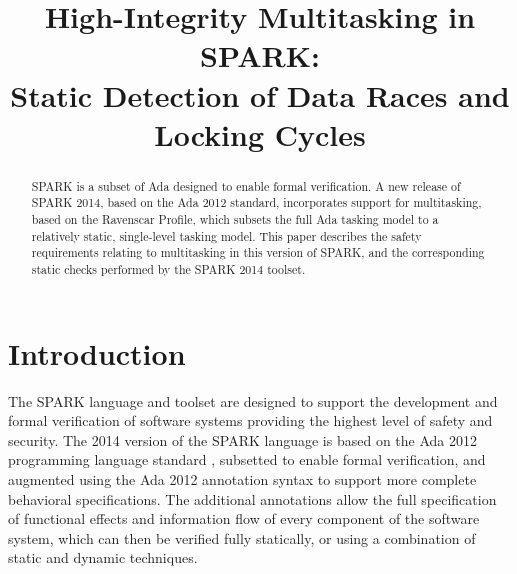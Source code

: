 \documentclass[conference,compsoc]{IEEEtran}
\begin{document}
\title{High-Integrity Multitasking in SPARK:\\
  Static Detection of Data Races and Locking Cycles}

\author{
\and
{}
\and
{}
}

\maketitle

%
%

\begin{abstract}
  SPARK is a subset of Ada designed to enable formal verification. A new
  release of SPARK 2014, based on the Ada 2012 standard, incorporates
  support for multitasking, based on the Ravenscar Profile, which subsets
  the full Ada tasking model to a relatively static, single-level tasking
  model. This paper describes the safety requirements relating to
  multitasking in this version of SPARK, and the corresponding static
  checks performed by the SPARK 2014 toolset.
\end{abstract}


%

\section{Introduction}
The SPARK language and toolset \cite{spark} are designed to support the
development and formal verification of software systems providing the
highest level of safety and security. The 2014 version of the SPARK
language is based on the Ada 2012 programming language standard \cite{lrm},
subsetted to enable formal verification, and augmented using the Ada 2012
annotation syntax to support more complete behavioral specifications. The
additional annotations allow the full specification of functional effects
and information flow of every component of the software system, which can
then be verified fully statically, or using a combination of static and
dynamic techniques.
\end{document}
